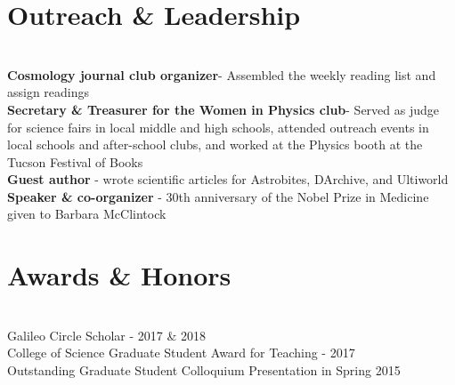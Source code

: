 \documentclass{res}
\begin{document}
\begin{resume}
\section{Outreach \& Leadership}
\vspace{-8pt}
\hrulefill\\
{\bf Cosmology journal club organizer}- Assembled the weekly reading list and assign readings\\
{\bf Secretary \& Treasurer for the Women in Physics club}- Served as judge for science fairs in local middle and high schools, attended outreach events in local schools and after-school clubs, and worked at the Physics booth at the Tucson Festival of Books\\
{\bf Guest author} - wrote scientific articles for Astrobites, DArchive, and Ultiworld\\
{\bf Speaker \& co-organizer} -  30th anniversary of the Nobel Prize in Medicine given to Barbara McClintock
        
\section{Awards \& Honors}
\vspace{-8pt}
\hrulefill\\
Galileo Circle Scholar - 2017 \& 2018\\
College of Science Graduate Student Award for Teaching - 2017\\
Outstanding Graduate Student Colloquium Presentation in Spring 2015


\end{resume}
\end{document}
